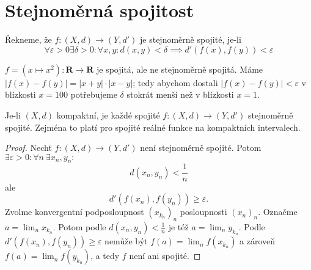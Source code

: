 \documentclass[../main.tex]{subfiles}
\begin{document}
\section{Stejnoměrná spojitost}
\begin{definition}
	Řekneme, že $f : (X,d) \rightarrow (Y,d')$ je stejnoměrně spojité, je-li
	\[\forall \varepsilon > 0 \exists \delta > 0 : \forall x,y : d(x,y) < \delta \implies d'(f(x),f(y)) < \varepsilon\]
\end{definition}

\begin{example}
	$f = (x \mapsto x^2) : \mathbf{R} \rightarrow \mathbf{R}$ je spojitá, ale ne stejnoměrně spojitá.
	Máme $|f(x) - f(y)| = |x+y| \cdot |x-y|$; tedy abychom dostali $|f(x)-f(y)| < \varepsilon $ v 
	blízkosti $x = 100$ potřebujeme $\delta$ stokrát menší než v blízkosti $x = 1$.
\end{example}

\begin{theorem}
	Je-li $(X,d)$ kompaktní, je každé spojité $f : (X,d) \rightarrow (Y,d')$ stejnoměrně spojité. Zejména to platí 
	pro spojité reálné funkce na kompaktních intervalech.
\end{theorem}

\begin{proof}
	Nechť $f : (X,d) \rightarrow (Y,d')$ není stejnoměrně spojité. Potom $\exists \varepsilon > 0 : \forall n\ \exists x_n, y_n :$
	\[d(x_n,y_n) < \frac{1}{n}\]
	ale
	\[d'(f(x_n),f(y_n)) \geq \varepsilon.\]
	Zvolme konvergentní podposloupnost $(x_{k_n})_n$ posloupnosti $(x_n)_n$. Označme $a = \lim_n x_{k_n}.$ Potom podle $d(x_n,y_n) < \frac{1}{n}$ je též 
	$a = \lim_n y_{k_n}.$ Podle $d'(f(x_n),f(y_n)) \geq \varepsilon$ nemůže být $f(a) = \lim_n f(x_{k_n})$ a zároveň $f(a) = \lim_n f(y_{k_n})$, 
	a tedy $f$ není ani spojité.
\end{proof}
\end{document}
